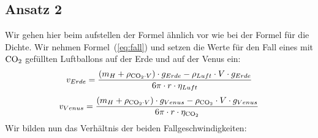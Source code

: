 \documentclass{article}
\begin{document}
      \subsection{Ansatz 2}
          Wir gehen hier beim aufstellen der Formel ähnlich vor wie bei der Formel für die Dichte. Wir nehmen Formel~(\ref{eq:fall})
          und setzen die Werte für den Fall eines mit \(\ce{CO2}\) gefüllten Luftballons auf der Erde und auf der Venus ein:
          \begin{equation}
              v_{Erde} = \frac{ \left( m_H + \rho_{\ce{CO2} \cdot V } \right) \cdot g_{Erde} - \rho_{Luft} \cdot V \cdot g_{Erde} }{ 6\pi \cdot r \cdot \eta_{Luft} }
          \end{equation}
          \begin{equation}
              v_{Venus} = \frac{ \left( m_H + \rho_{\ce{CO2} \cdot V } \right) \cdot g_{Venus} - \rho_{\ce{CO2}} \cdot V \cdot g_{Venus} }{ 6\pi \cdot r \cdot \eta_{\ce{CO2}} }
          \end{equation}
          Wir bilden nun das Verhältnis der beiden Fallgeschwindigkeiten:
\end{document}
